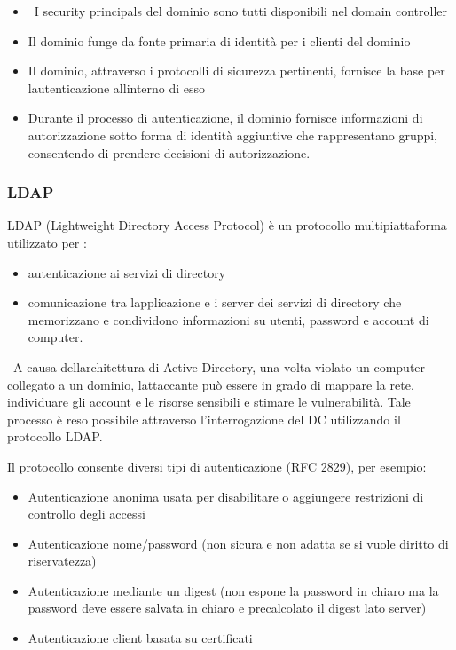 \documentclass[
]{article}
\providecommand{\tightlist}{%
  \setlength{\itemsep}{0pt}\setlength{\parskip}{0pt}}
\begin{document}
\begin{itemize}
\tightlist
\item
  {~I security principals del dominio sono tutti disponibili nel domain
  controller }
\item
  {Il dominio funge da fonte primaria di identità per i clienti del
  dominio }
\item
  {Il dominio, attraverso i protocolli di sicurezza pertinenti, fornisce
  la base per l\textquotesingle autenticazione
  all\textquotesingle interno di esso }
\item
  {Durante il processo di autenticazione, il dominio fornisce
  informazioni di autorizzazione sotto forma di identità aggiuntive che
  rappresentano gruppi, consentendo di prendere decisioni di
  autorizzazione.}
\end{itemize}

\subsubsection{\texorpdfstring{{LDAP}}{LDAP}}\label{h.9yklstq49j64}

{LDAP (Lightweight Directory Access Protocol) è un protocollo
multipiattaforma utilizzato per : }

\begin{itemize}
\tightlist
\item
  {autenticazione ai servizi di directory }
\item
  {comunicazione tra l\textquotesingle applicazione e i server dei
  servizi di directory che memorizzano e condividono informazioni su
  utenti, password e account di computer.}
\end{itemize}

{~A causa dell\textquotesingle architettura di Active Directory, una
volta violato un computer collegato a un dominio,
l\textquotesingle attaccante può essere in grado di mappare la rete,
individuare gli account e le risorse sensibili e stimare le
vulnerabilità. Tale processo è reso possibile attraverso
l'interrogazione del DC utilizzando il protocollo LDAP.}

{}

{Il protocollo consente diversi tipi di autenticazione (RFC 2829), per
esempio:}

\begin{itemize}
\tightlist
\item
  {Autenticazione anonima usata per disabilitare o aggiungere
  restrizioni di controllo degli accessi }
\item
  {Autenticazione nome/password (non sicura e non adatta se si vuole
  diritto di riservatezza) }
\item
  {Autenticazione mediante un digest (non espone la password in chiaro
  ma la password deve essere salvata in chiaro e precalcolato il digest
  lato server) ~}
\item
  {Autenticazione client basata su certificati}
\end{itemize}
\end{document}
